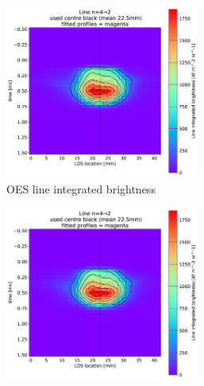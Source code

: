 \begin{figure}
     \centering
     \begin{subfigure}{0.8\linewidth}
         \centering
         \includegraphics[width=0.7\textwidth,trim={20 170 550 300},clip]{Chapters/chapter3/figs/line_integrted_profile4.png}
         \caption{OES line integrated brightness}
         \label{fig:sampling4a}
     \end{subfigure}
     \begin{subfigure}{0.14\linewidth}
         \vspace*{-10mm}
         \hspace*{-20mm}
         \includegraphics[width=0.7\textwidth,trim={2200 0 0 40},clip]{Chapters/chapter3/figs/line_integrted_profile4.png}

\end{subfigure}
\end{figure}
